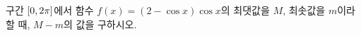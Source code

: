 구간 $[0{,}\mkern3mu\mathopen{}2\pi]$에서 함수 $f(x)=(2-\cos x)\cos x$의 최댓값을 $M$, 최솟값을 $m$이라 할 때, $M-m$의 값을 구하시오.
